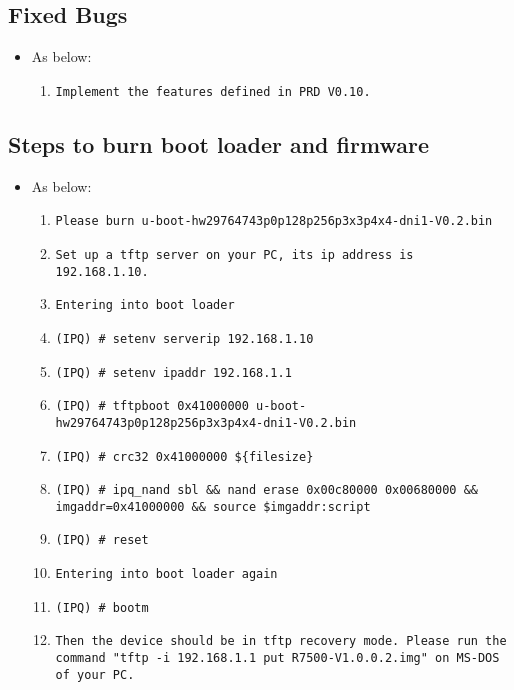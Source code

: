 \documentclass[12pt]{report}
\begin{document}
    \subsection{Fixed Bugs}
    \begin{itemize}
    \item As below:
    	\begin{enumerate}
		\item \texttt{Implement the features defined in PRD V0.10.}
    	\end{enumerate}
    \end{itemize}

    \subsection{Steps to burn boot loader and firmware}
    \begin{itemize}
    \item As below:
            \begin{enumerate}
	    	\item \texttt{Please burn u-boot-hw29764743p0p128p256p3x3p4x4-dni1-V0.2.bin}
		\item \texttt{Set up a tftp server on your PC, its ip address is 192.168.1.10.}
		\item \texttt{Entering into boot loader}
		\item \texttt{(IPQ) \# setenv serverip 192.168.1.10}
		\item \texttt{(IPQ) \# setenv ipaddr 192.168.1.1}
		\item \texttt{(IPQ) \# tftpboot 0x41000000 u-boot-hw29764743p0p128p256p3x3p4x4-dni1-V0.2.bin}
		\item \texttt{(IPQ) \# crc32 0x41000000 \$\{filesize\}}
		\item \texttt{(IPQ) \# ipq\_nand sbl \&\& nand erase 0x00c80000 0x00680000 \&\& imgaddr=0x41000000 \&\& source \$imgaddr:script}
		\item \texttt{(IPQ) \# reset}
		\item \texttt{Entering into boot loader again}
		\item \texttt{(IPQ) \# bootm}
		\item \texttt{Then the device should be in tftp recovery mode. Please run the command "tftp -i 192.168.1.1 put R7500-V1.0.0.2.img" on MS-DOS of your PC.}
            \end{enumerate}
    \end{itemize}
\end{document}
